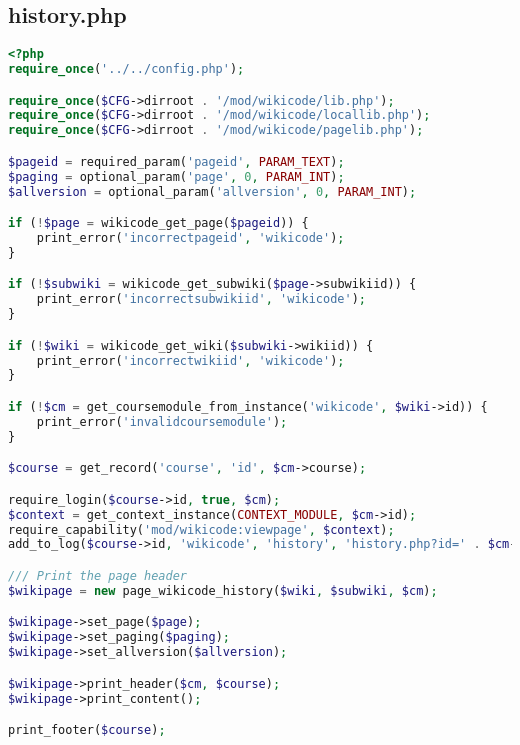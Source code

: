 \subsection{history.php}
\begin{lstlisting}[language=PHP]
<?php
require_once('../../config.php');

require_once($CFG->dirroot . '/mod/wikicode/lib.php');
require_once($CFG->dirroot . '/mod/wikicode/locallib.php');
require_once($CFG->dirroot . '/mod/wikicode/pagelib.php');

$pageid = required_param('pageid', PARAM_TEXT);
$paging = optional_param('page', 0, PARAM_INT);
$allversion = optional_param('allversion', 0, PARAM_INT);

if (!$page = wikicode_get_page($pageid)) {
    print_error('incorrectpageid', 'wikicode');
}

if (!$subwiki = wikicode_get_subwiki($page->subwikiid)) {
    print_error('incorrectsubwikiid', 'wikicode');
}

if (!$wiki = wikicode_get_wiki($subwiki->wikiid)) {
    print_error('incorrectwikiid', 'wikicode');
}

if (!$cm = get_coursemodule_from_instance('wikicode', $wiki->id)) {
    print_error('invalidcoursemodule');
}

$course = get_record('course', 'id', $cm->course);

require_login($course->id, true, $cm);
$context = get_context_instance(CONTEXT_MODULE, $cm->id);
require_capability('mod/wikicode:viewpage', $context);
add_to_log($course->id, 'wikicode', 'history', 'history.php?id=' . $cm->id, $wiki->id);

/// Print the page header
$wikipage = new page_wikicode_history($wiki, $subwiki, $cm);

$wikipage->set_page($page);
$wikipage->set_paging($paging);
$wikipage->set_allversion($allversion);

$wikipage->print_header($cm, $course);
$wikipage->print_content();

print_footer($course);
\end{lstlisting}

